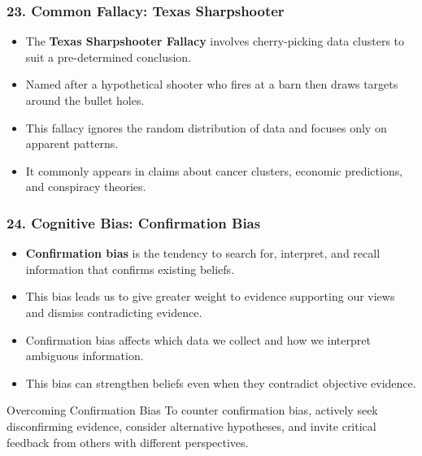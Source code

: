 \documentclass{beamer}
\begin{document}
\begin{frame}
\frametitle{23. Common Fallacy: Texas Sharpshooter}
\begin{itemize}
\item The \textbf{Texas Sharpshooter Fallacy} involves cherry-picking data clusters to suit a pre-determined conclusion.
\item Named after a hypothetical shooter who fires at a barn then draws targets around the bullet holes.
\item This fallacy ignores the random distribution of data and focuses only on apparent patterns.
\item It commonly appears in claims about cancer clusters, economic predictions, and conspiracy theories.
\end{itemize}

\end{frame}

\begin{frame}
\frametitle{24. Cognitive Bias: Confirmation Bias}
\begin{itemize}
\item \textbf{Confirmation bias} is the tendency to search for, interpret, and recall information that confirms existing beliefs.
\item This bias leads us to give greater weight to evidence supporting our views and dismiss contradicting evidence.
\item Confirmation bias affects which data we collect and how we interpret ambiguous information.
\item This bias can strengthen beliefs even when they contradict objective evidence.
\end{itemize}

\begin{block}{Overcoming Confirmation Bias}
To counter confirmation bias, actively seek disconfirming evidence, consider alternative hypotheses, and invite critical feedback from others with different perspectives.
\end{block}
\end{frame}
\end{document}
